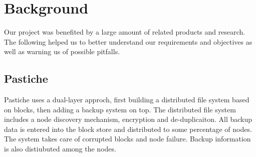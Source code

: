\section{Background}
Our project was benefited by a large amount of related products and research. The following helped us to better understand our requirements and objectives as well as warning us of possible pitfalls.
\subsection{Pastiche}
Pastiche uses a dual-layer approch, first building a distributed file system based on blocks, then adding a backup system on top. The distributed file system includes a node discovery mechanism, encryption and de-duplicaiton. All backup data is entered into the block store and distributed to some percentage of nodes. The system takes care of corrupted blocks and node failure. Backup information is also distiubuted among the nodes.
